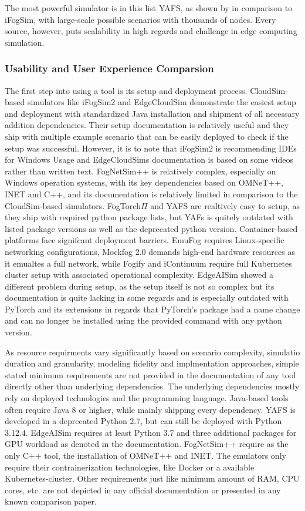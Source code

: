 The most powerful simulator is in this list YAFS, as shown by \cite{sim-yafs} in comparison to iFogSim, with large-scale possible scenarios with thousands of nodes.
Every source, however, puts scalability in high regards and challenge in edge computing simulation.

\subsubsection{Usability and User Experience Comparsion}

The first step into using a tool is its setup and deployment process.
CloudSim-based simulators like iFogSim2 and EdgeCloudSim demonstrate the easiest setup and deployment with standardized Java installation and shipment of all necessary addition dependencies.
Their setup documentation is relatively useful and they ship with multiple example scenario that can be easily deployed to check if the setup was successful.
However, it is to note that iFogSim2 is recommending IDEs for Windows Usage and EdgeCloudSims documentation is based on some videos rather than written text.
FogNetSim++ is relatively complex, especially on Windows operation systems, with its key dependencies based on OMNeT++, INET and C++, and its documentation is relatively limited in comparison to the CloudSim-based simulators.
FogTorch$\Pi$ and YAFS are realtively easy to setup, as they ship with required python package lists, but YAFs is quitely outdated with listed package versions as well as the deprecated python version.
Container-based platforms face signifcant deployment barriers.
EmuFog requires Linux-specific networking configurations, Mockfog 2.0 demands high-end hardware resources as it emualtes a full network, while Fogify and iContinuum require full Kubernetes cluster setup with associated operational complexity.
EdgeAISim showed a different problem during setup, as the setup itself is not so complex but its documentation is quite lacking in some regards and is especially outdated with PyTorch and its extensions in regards that PyTorch's package had a name change and can no longer be installed using the provided command with any python version.

As resource requirments vary significantly based on scenario complexity, simulatio duration and granularity, modeling fidelity and implmentation approaches, simple stated minimum requirements are not provided in the documentation of any tool directly other than underlying dependencies.
The underlying dependencies mostly rely on deployed technologies and the programming language.
Java-based tools often require Java 8 or higher, while mainly shipping every dependency.
YAFS is developed in a deprecated Python 2.7, but can still be deployed with Python 3.12.4.
EdgeAISim requires at least Python 3.7 and three additional packages for GPU workload as denoted in the documentation.
FogNetSim++ require as the only C++ tool, the installation of OMNeT++ and INET.
The emulators only require their contrainerization technologies, like Docker or a available Kubernetes-cluster.
Other requirements just like minimum amount of RAM, CPU cores, etc. are not depicted in any official documentation or presented in any known comparison paper.

